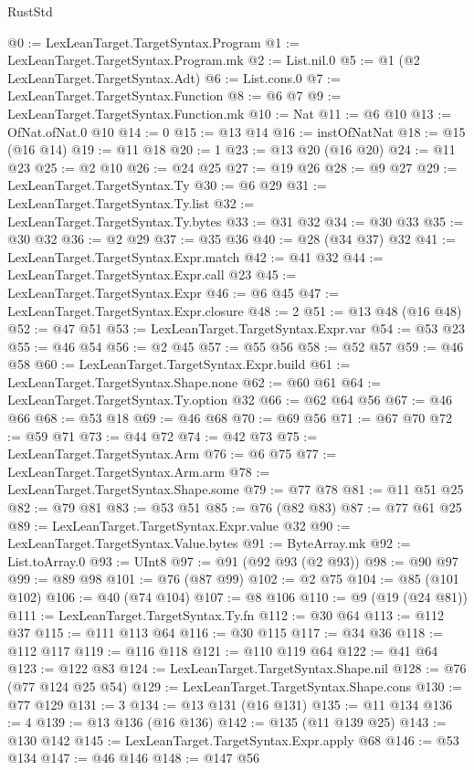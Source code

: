 \begin{lexlean}{RustStd}
\begin{coremodule}
@0 := LexLeanTarget.TargetSyntax.Program
@1 := LexLeanTarget.TargetSyntax.Program.mk
@2 := List.nil.{0}
@5 := @1 (@2 LexLeanTarget.TargetSyntax.Adt)
@6 := List.cons.{0}
@7 := LexLeanTarget.TargetSyntax.Function
@8 := @6 @7
@9 := LexLeanTarget.TargetSyntax.Function.mk
@10 := Nat
@11 := @6 @10
@13 := OfNat.ofNat.{0} @10
@14 := 0
@15 := @13 @14
@16 := instOfNatNat
@18 := @15 (@16 @14)
@19 := @11 @18
@20 := 1
@23 := @13 @20 (@16 @20)
@24 := @11 @23
@25 := @2 @10
@26 := @24 @25
@27 := @19 @26
@28 := @9 @27
@29 := LexLeanTarget.TargetSyntax.Ty
@30 := @6 @29
@31 := LexLeanTarget.TargetSyntax.Ty.list
@32 := LexLeanTarget.TargetSyntax.Ty.bytes
@33 := @31 @32
@34 := @30 @33
@35 := @30 @32
@36 := @2 @29
@37 := @35 @36
@40 := @28 (@34 @37) @32
@41 := LexLeanTarget.TargetSyntax.Expr.match
@42 := @41 @32
@44 := LexLeanTarget.TargetSyntax.Expr.call @23
@45 := LexLeanTarget.TargetSyntax.Expr
@46 := @6 @45
@47 := LexLeanTarget.TargetSyntax.Expr.closure
@48 := 2
@51 := @13 @48 (@16 @48)
@52 := @47 @51
@53 := LexLeanTarget.TargetSyntax.Expr.var
@54 := @53 @23
@55 := @46 @54
@56 := @2 @45
@57 := @55 @56
@58 := @52 @57
@59 := @46 @58
@60 := LexLeanTarget.TargetSyntax.Expr.build
@61 := LexLeanTarget.TargetSyntax.Shape.none
@62 := @60 @61
@64 := LexLeanTarget.TargetSyntax.Ty.option @32
@66 := @62 @64 @56
@67 := @46 @66
@68 := @53 @18
@69 := @46 @68
@70 := @69 @56
@71 := @67 @70
@72 := @59 @71
@73 := @44 @72
@74 := @42 @73
@75 := LexLeanTarget.TargetSyntax.Arm
@76 := @6 @75
@77 := LexLeanTarget.TargetSyntax.Arm.arm
@78 := LexLeanTarget.TargetSyntax.Shape.some
@79 := @77 @78
@81 := @11 @51 @25
@82 := @79 @81
@83 := @53 @51
@85 := @76 (@82 @83)
@87 := @77 @61 @25
@89 := LexLeanTarget.TargetSyntax.Expr.value @32
@90 := LexLeanTarget.TargetSyntax.Value.bytes
@91 := ByteArray.mk
@92 := List.toArray.{0}
@93 := UInt8
@97 := @91 (@92 @93 (@2 @93))
@98 := @90 @97
@99 := @89 @98
@101 := @76 (@87 @99)
@102 := @2 @75
@104 := @85 (@101 @102)
@106 := @40 (@74 @104)
@107 := @8 @106
@110 := @9 (@19 (@24 @81))
@111 := LexLeanTarget.TargetSyntax.Ty.fn
@112 := @30 @64
@113 := @112 @37
@115 := @111 @113 @64
@116 := @30 @115
@117 := @34 @36
@118 := @112 @117
@119 := @116 @118
@121 := @110 @119 @64
@122 := @41 @64
@123 := @122 @83
@124 := LexLeanTarget.TargetSyntax.Shape.nil
@128 := @76 (@77 @124 @25 @54)
@129 := LexLeanTarget.TargetSyntax.Shape.cons
@130 := @77 @129
@131 := 3
@134 := @13 @131 (@16 @131)
@135 := @11 @134
@136 := 4
@139 := @13 @136 (@16 @136)
@142 := @135 (@11 @139 @25)
@143 := @130 @142
@145 := LexLeanTarget.TargetSyntax.Expr.apply @68
@146 := @53 @134
@147 := @46 @146
@148 := @147 @56

\end{coremodule}
\end{lexlean}
